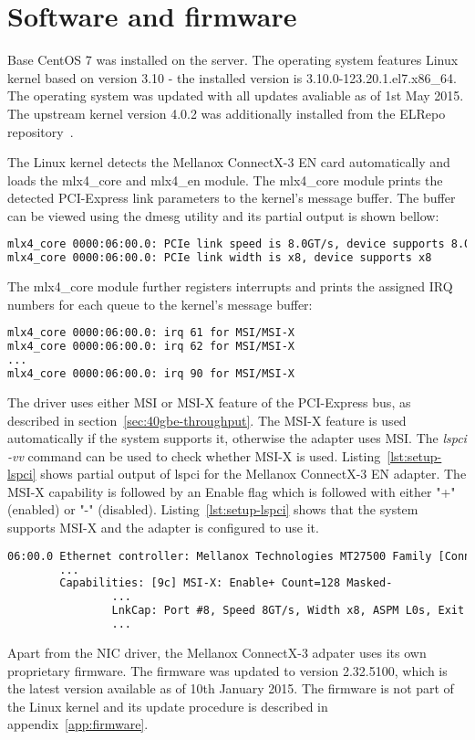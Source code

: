 
\section{Software and firmware}
Base CentOS 7 was installed on the server.
The operating system features Linux kernel based on version 3.10 -
the installed version is 3.10.0-123.20.1.el7.x86\_64.
The operating system was updated with all updates avaliable as of 1st May 2015.
The upstream kernel version 4.0.2 was additionally installed from the ELRepo repository~\cite{elrepo-kernel-ml}.

The Linux kernel detects the Mellanox ConnectX-3 EN card automatically and loads the mlx4\_core and mlx4\_en module.
The mlx4\_core module prints the detected PCI-Express link parameters to the kernel's message buffer.
The buffer can be viewed using the dmesg utility and its partial output is shown bellow:
\begin{lstlisting}[language=TeX]
mlx4_core 0000:06:00.0: PCIe link speed is 8.0GT/s, device supports 8.0GT/s
mlx4_core 0000:06:00.0: PCIe link width is x8, device supports x8
\end{lstlisting}
The mlx4\_core module further registers interrupts and prints the assigned IRQ numbers for each queue
to the kernel's message buffer:
\begin{lstlisting}[language=TeX]
mlx4_core 0000:06:00.0: irq 61 for MSI/MSI-X
mlx4_core 0000:06:00.0: irq 62 for MSI/MSI-X
...
mlx4_core 0000:06:00.0: irq 90 for MSI/MSI-X
\end{lstlisting}

The driver uses either MSI or MSI-X feature of the PCI-Express bus, as described in section~\ref{sec:40gbe-throughput}.
The MSI-X feature is used automatically if the system supports it, otherwise the adapter uses MSI.
The {\it{lspci -vv}} command can be used to check whether MSI-X is used.
Listing~\ref{lst:setup-lspci} shows partial output of lspci for the Mellanox ConnectX-3 EN adapter.
The MSI-X capability is followed by an Enable flag which is followed with either "+" (enabled)
or "-" (disabled).
Listing~\ref{lst:setup-lspci} shows that the system supports MSI-X and the adapter is configured to use it.
\begin{lstlisting}[language=TeX,label={lst:setup-lspci},caption={Partial output of lspci -vv for Mellanox ConnectX-3 EN}]
06:00.0 Ethernet controller: Mellanox Technologies MT27500 Family [ConnectX-3]
		...
		Capabilities: [9c] MSI-X: Enable+ Count=128 Masked-
				...
				LnkCap: Port #8, Speed 8GT/s, Width x8, ASPM L0s, Exit Latency L0s unlimited, L1 unlimited
				...
\end{lstlisting}

Apart from the NIC driver, the Mellanox ConnectX-3 adpater uses its own proprietary firmware.
The firmware was updated to version 2.32.5100, which is the latest version available as of 10th January 2015.
The firmware is not part of the Linux kernel and its update procedure is described in appendix~\ref{app:firmware}.

